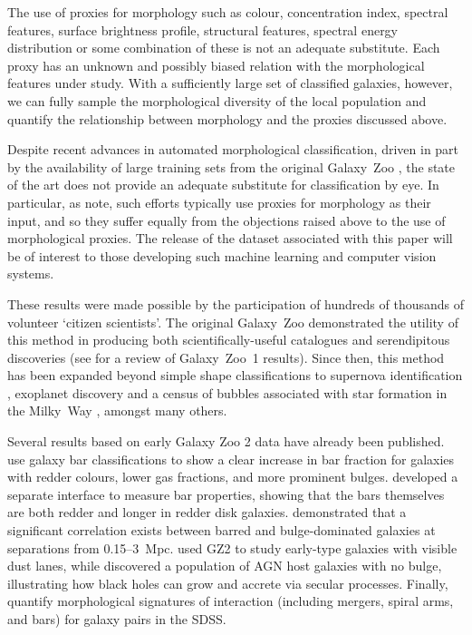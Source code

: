 \documentclass[useAMS,usenatbib]{mn2e}
\begin{document}
The use of proxies for morphology such as colour, concentration index, spectral features, surface brightness profile, structural features, spectral energy distribution or some combination of these is not an adequate substitute. Each proxy has an unknown and possibly biased relation with the morphological features under study. With a sufficiently large set of classified galaxies, however, we can fully sample the morphological diversity of the local population and quantify the relationship between morphology and the proxies discussed above. 

Despite recent advances in automated morphological classification, driven in part by the availability of large training sets from the original Galaxy~Zoo \citep{ban10,hue11,dav13}, the state of the art does not provide an adequate substitute for classification by eye. In particular, as \citet{lin11} note, such efforts typically use proxies for morphology as their input, and so they suffer equally from the objections raised above to the use of morphological proxies. The release of the dataset associated with this paper will be of interest to those developing such machine learning and computer vision systems. 

These results were made possible by the participation of hundreds of thousands of volunteer `citizen scientists'. The original Galaxy~Zoo demonstrated the utility of this method in producing both scientifically-useful catalogues and serendipitous discoveries (see \citealt{lin11} for a review of Galaxy~Zoo~1 results). Since then, this method has been expanded beyond simple shape classifications to supernova identification \citep{smi11}, exoplanet discovery \citep{fis12,sch12} and a census of bubbles associated with star formation in the Milky~Way \citep{sim12a}, amongst many others. 

Several results based on early Galaxy Zoo 2 data have already been published. \citet{mas11c,mas12a} use galaxy bar classifications to show a clear increase in bar fraction for galaxies with redder colours, lower gas fractions, and more prominent bulges. \citet{hoy11} developed a separate interface to measure bar properties, showing that the bars themselves are both redder and longer in redder disk galaxies. \citet{ski12} demonstrated that a significant correlation exists between barred and bulge-dominated galaxies at separations from 0.15--3~Mpc. \citet{kav12a} used GZ2 to study early-type galaxies with visible dust lanes, while \citet{sim13} discovered a population of AGN host galaxies with no bulge, illustrating how black holes can grow and accrete via secular processes. Finally, \citet{cas13} quantify morphological signatures of interaction (including mergers, spiral arms, and bars) for galaxy pairs in the SDSS. 
\end{document}
